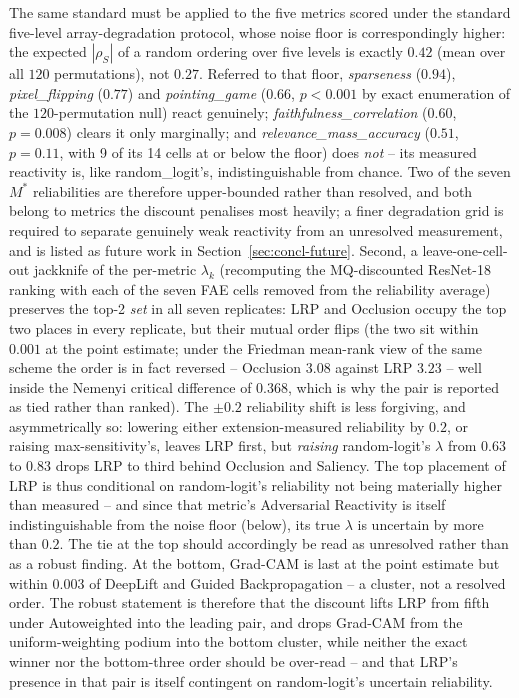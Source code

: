 The same standard must be applied to the five metrics scored under the
standard five-level array-degradation protocol, whose noise floor is
correspondingly higher: the expected $|\rho_S|$ of a random ordering over
five levels is exactly $0.42$ (mean over all $120$ permutations), not
$0.27$. Referred to that floor, \emph{sparseness} ($0.94$),
\emph{pixel\_flipping} ($0.77$) and \emph{pointing\_game} ($0.66$,
$p < 0.001$ by exact enumeration of the $120$-permutation null) react
genuinely;
\emph{faithfulness\_correlation} ($0.60$, $p = 0.008$) clears it only
marginally; and \emph{relevance\_mass\_accuracy} ($0.51$, $p = 0.11$,
with 9 of its 14 cells at or below the floor) does \emph{not} -- its
measured reactivity is, like random\_logit's, indistinguishable from
chance. Two of the seven $M^{*}$ reliabilities are therefore
upper-bounded rather than resolved, and both belong to metrics the
discount penalises most heavily; a finer degradation grid is required to
separate genuinely weak reactivity from an unresolved measurement, and is
listed as future work in Section~\ref{sec:concl-future}. Second, a
leave-one-cell-out jackknife of the per-metric
$\lambda_k$ (recomputing the MQ-discounted ResNet-18 ranking with each of
the seven FAE cells removed from the reliability average) preserves the
top-2 \emph{set} in all seven replicates: LRP and Occlusion occupy the top
two places in every replicate, but their mutual order flips (the two sit
within $0.001$ at the point estimate; under the Friedman mean-rank view of
the same scheme the order is in fact reversed -- Occlusion $3.08$ against
LRP $3.23$ -- well inside the Nemenyi critical difference of $0.368$, which
is why the pair is reported as tied rather than ranked). The $\pm 0.2$ reliability shift is
less forgiving, and asymmetrically so: lowering either extension-measured
reliability by $0.2$, or raising max-sensitivity's, leaves LRP first, but
\emph{raising} random-logit's $\lambda$ from $0.63$ to $0.83$ drops LRP to
third behind Occlusion and Saliency. The top placement of LRP is thus
conditional on random-logit's reliability not being materially higher than
measured -- and since that metric's Adversarial Reactivity is itself
indistinguishable from the noise floor (below), its true $\lambda$ is
uncertain by more than $0.2$. The tie at the top should accordingly be read
as unresolved rather than as a robust finding. At the bottom, Grad-CAM is
last at the point estimate but within $0.003$ of DeepLift and Guided
Backpropagation -- a cluster, not a resolved order. The robust statement
is therefore that the discount lifts LRP from fifth under Autoweighted
into the leading pair, and drops Grad-CAM from
the uniform-weighting podium into the bottom cluster, while neither the
exact winner nor the bottom-three order should be over-read -- and that
LRP's presence in that pair is itself contingent on random-logit's
uncertain reliability.

